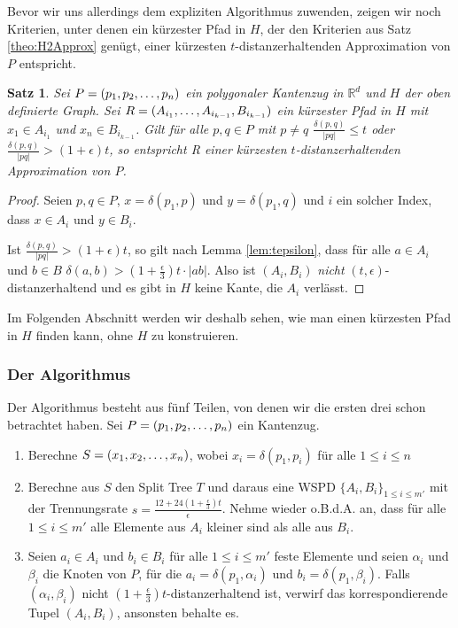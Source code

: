 \documentclass[11pt]{article}
\newcommand{\R}{\mathbb{R}}
\newtheorem{theorem}{Satz}[section]
\begin{document}
    Bevor wir uns allerdings dem expliziten Algorithmus zuwenden, zeigen wir noch Kriterien, unter denen ein kürzester Pfad in $H$, der den Kriterien aus Satz \ref{theo:H2Approx} genügt, einer kürzesten $t$-distanzerhaltenden Approximation von $P$ entspricht.
    
    \begin{theorem}
    	Sei $P = (p_1, p_2, \mathellipsis, p_n)$ ein polygonaler Kantenzug in $\R^d$ und $H$ der oben definierte Graph. Sei $R = (A_{i_1}, \mathellipsis, A_{i_{k-1}}, B_{i_{k-1}})$ ein kürzester Pfad in $H$ mit $x_1 \in A_{i_1}$ und $x_n \in B_{i_{k-1}}$. Gilt für alle $p, q \in P$ mit $p \neq q$ $\frac{\delta(p, q)}{|pq|} \leq t$ oder $\frac{\delta(p, q)}{|pq|} > (1+\epsilon)t$, so entspricht R einer kürzesten $t$-distanzerhaltenden Approximation von $P$.
    \end{theorem}
    
    \begin{proof}
    	Seien $p, q \in P$, $x = \delta(p_1, p)$ und $y = \delta(p_1, q)$ und $i$ ein solcher Index, dass $x \in A_i$ und $y \in B_i$. 
    	
    	Ist $\frac{\delta(p, q)}{|pq|} > (1+\epsilon)t$, so gilt nach Lemma \ref{lem:tepsilon}, dass für alle $a \in A_i$ und $b \in B$ $\delta(a, b) > (1 + \frac{\epsilon}{3})t \cdot |ab|$. Also ist $(A_i, B_i)$ \emph{nicht} $(t, \epsilon)$-distanzerhaltend und es gibt in $H$ keine Kante, die $A_i$ verlässt.
    \end{proof}
    
    Im Folgenden Abschnitt werden wir deshalb sehen, wie man einen kürzesten Pfad in $H$ finden kann, ohne $H$ zu konstruieren.
    
    \subsubsection*{Der Algorithmus}
    Der Algorithmus besteht aus fünf Teilen, von denen wir die ersten drei schon betrachtet haben.
    Sei $P = (p_1, p_2, \mathellipsis, p_n)$ ein Kantenzug.
    \begin{enumerate}
    	\item Berechne $S = (x_1, x_2, \mathellipsis, x_n)$, wobei $x_i = \delta(p_1, p_i)$ für alle $1 \leq i \leq n$
    	\item Berechne aus $S$ den Split Tree $T$ und daraus eine WSPD $\{A_i, B_i\}_{1 \leq i \leq m'}$ mit der Trennungsrate $s = \frac{12 + 24(1 + \frac{\epsilon}{3})t}{\epsilon}$. Nehme wieder o.B.d.A. an, dass für alle $1 \leq i \leq m'$ alle Elemente aus $A_i$ kleiner sind als alle aus $B_i$.
    	\item Seien $a_i \in A_i$ und $b_i \in B_i$ für alle $1 \leq i \leq m'$ feste Elemente und seien $\alpha_i$ und  $\beta_i$ die Knoten von $P$, für die $a_i = \delta(p_1, \alpha_i)$ und $b_i = \delta(p_1, \beta_i)$. Falls $(\alpha_i, \beta_i)$ nicht $(1+\frac{\epsilon}{3})t$-distanzerhaltend ist, verwirf das korrespondierende Tupel $(A_i, B_i)$, ansonsten behalte es.
    \end{enumerate}
    
\end{document}
